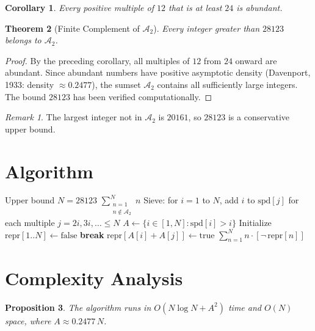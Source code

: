 \documentclass[12pt,a4paper]{article}
\newtheorem{theorem}{Theorem}
\newtheorem{corollary}[theorem]{Corollary}
\newtheorem{proposition}[theorem]{Proposition}
\theoremstyle{definition}
\theoremstyle{remark}
\newtheorem*{remark}{Remark}
\begin{document}
\begin{corollary}
Every positive multiple of $12$ that is at least $24$ is abundant.
\end{corollary}

\begin{theorem}[Finite Complement of $\mathcal{A}_2$]
Every integer greater than $28123$ belongs to $\mathcal{A}_2$.
\end{theorem}

\begin{proof}
By the preceding corollary, all multiples of $12$ from $24$ onward are abundant. Since abundant numbers have positive asymptotic density (Davenport, 1933: density $\approx 0.2477$), the sumset $\mathcal{A}_2$ contains all sufficiently large integers. The bound $28123$ has been verified computationally.
\end{proof}

\begin{remark}
The largest integer not in $\mathcal{A}_2$ is $20161$, so $28123$ is a conservative upper bound.
\end{remark}

\section{Algorithm}

\begin{algorithm}[H]
\caption{Sum of Non-Abundant Sums}
\begin{algorithmic}[1]
\REQUIRE Upper bound $N = 28123$
\ENSURE $\displaystyle\sum_{\substack{n=1 \\ n \notin \mathcal{A}_2}}^{N} n$
\STATE Sieve: for $i = 1$ to $N$, add $i$ to $\mathrm{spd}[j]$ for each multiple $j = 2i, 3i, \ldots \leq N$
\STATE $A \gets \{i \in [1, N] : \mathrm{spd}[i] > i\}$
\STATE Initialize $\mathrm{repr}[1..N] \gets \mathrm{false}$
            \STATE \textbf{break}
        \ENDIF
        \STATE $\mathrm{repr}[A[i] + A[j]] \gets \mathrm{true}$
    \ENDFOR
\ENDFOR
\RETURN $\sum_{n=1}^{N} n \cdot [\neg\,\mathrm{repr}[n]]$
\end{algorithmic}
\end{algorithm}

\section{Complexity Analysis}

\begin{proposition}
The algorithm runs in $O(N \log N + A^2)$ time and $O(N)$ space, where $A \approx 0.2477\,N$.
\end{proposition}
\end{document}

